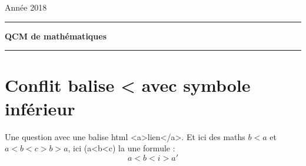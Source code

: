 \documentclass[12pt,a4paper]{article}
\begin{document}
 
 


\hfill\textsf{Ann\'ee 2018}

\vspace*{0.5ex}
\hrule\vspace*{1.5ex} 
\hfil{\textbf{\Large QCM de mathématiques}}
\vspace*{1ex} \hrule 
\vspace*{5ex} 

\section{Conflit balise < avec symbole inférieur}


\begin{question}
Une question avec une balise html <a>lien</a>.
Et ici des maths $b<a$ et $a<b<c>b>a$, ici (a<b<c) la une formule :
$$a<b<i>a'$$

\begin{answers}  
\end{answers}
\end{question}
\end{document}
